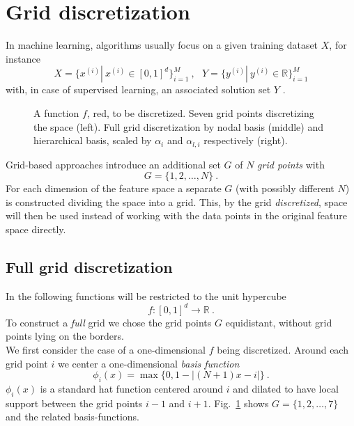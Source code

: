 \section{Grid discretization}\label{sec:grid}

In machine learning, algorithms usually focus on a given training dataset
$X$, for instance
$$ X = \{x^{(i)} | \ x^{(i)} \in [0, 1]^d\}_{i = 1}^M \ , \ \ \
Y = \{y^{(i)} | \ y^{(i)} \in \mathbb{R}\}_{i=1}^M$$
with, in case of supervised learning, an associated solution set $Y$
\cite{artbunshort}.

\par

\begin{figure}[t!]
  \centering
  
  
  
  \caption{A function $f$, red, to be discretized.
    Seven grid points discretizing the space
    (left). Full grid discretization by nodal basis (middle) and
    hierarchical basis, scaled by $\alpha_i$ and $\alpha_{l,i}$
    respectively (right).\label{fig:fig1}}
\end{figure}

Grid-based approaches introduce an additional set $G$ of $N$
\emph{grid points} with
$$ G = \{1,2,\dots,N\} \ .$$
For each dimension of the feature space a separate $G$ (with possibly
different $N$) is constructed dividing the space into a grid.
This, by the grid \emph{discretized}, space
will then be used instead of working with the data points in the original
feature space directly.

\subsection{Full grid discretization}\label{subsec:fullgrid}
In the following functions
will be restricted to the unit hypercube
 $$ f: [0, 1]^d \rightarrow \mathbb{R} \ .$$
To construct a \emph{full} grid we chose the grid points $G$ equidistant,
without grid points lying on the borders. \\
We first consider the case of a one-dimensional $f$ being discretized.
Around each grid point $i$ we center a one-dimensional
\emph{basis function}
$$ \phi_i(x) = \max\{0, 1 - |(N + 1)x - i|\} \ .$$
$\phi_i(x)$ is a standard hat function centered around $i$ and dilated
to have local support between the grid points $i - 1$ and $i + 1$. Fig.~\ref{fig:fig1}
shows $G = \{1,2,\dots,7\}$ and the related basis-functions.

